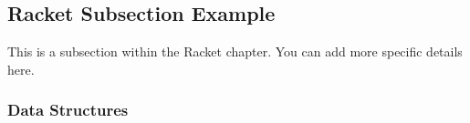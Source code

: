 
\subsection{Racket Subsection Example}

This is a subsection within the Racket chapter. You can add more specific details here.

\subsubsection{Data Structures}
\lipsum[7]
